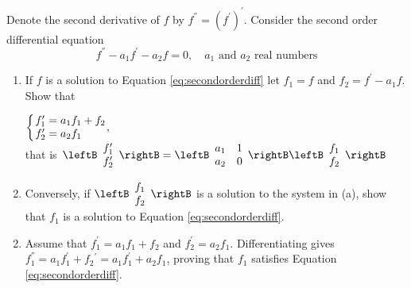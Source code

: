 \begin{multicols}{2}
\begin{ex} \label{ex:3_5_6}
Denote the second derivative of $f$ by $f^{\dprime} = (f^{\prime})^{\prime}$. Consider the second order differential equation 
\begin{equation}\label{eq:secondorderdiff}
f^{\dprime} - a_1 f^{\prime}-a_2 f = 0, \quad a_1 \mbox{ and } a_2 \mbox{ real numbers} 
\end{equation}
\begin{enumerate}[label={\alph*.}]
\item If $f$ is a solution to Equation \ref{eq:secondorderdiff}
 let $f_{1} = f$ and $f_{2} = f^{\prime} - a_{1}f$. Show that

$
\left\lbrace \arraycolsep=1pt
\begin{array}{l}
f_1^{\prime} = a_1f_1 + f_2 \\
f_2^{\prime} = a_2f_1
\end{array}, \right.  $ \\ that is $ \left. \leftB \arraycolsep=5pt \begin{array}{c}
f_1^{\prime} \\
f_2^{\prime}
\end{array}\rightB = \leftB \arraycolsep=5pt   \begin{array}{cc}
a_1 & 1 \\
a_2 & 0 
\end{array}\rightB \leftB \arraycolsep=5pt  \begin{array}{c}
f_1 \\
f_2
\end{array}\rightB \right.
$


\item Conversely, if $\leftB \begin{array}{c}
f_1 \\
f_2
\end{array}\rightB$
 is a solution to the system in (a), show that $f_{1}$ is a solution to Equation \ref{eq:secondorderdiff}.

\end{enumerate}
\begin{sol}
\begin{enumerate}[label={\alph*.}]
\setcounter{enumi}{1}
\item  Assume that $f_{1}^{\prime} = a_{1}f_{1} + f_{2}$ and $f_{2}^{\prime} = a_{2}f_{1}$. Differentiating gives $f_{1}^{\dprime} = a_{1}f_{1}^{\prime} + f_{2}{}^{\prime} = a_{1}f_{1}^{\prime} + a_{2}f_{1}$, proving that $f_{1}$ satisfies Equation \ref{eq:secondorderdiff}.


\end{enumerate}
\end{sol}
\end{ex}
\end{multicols}
